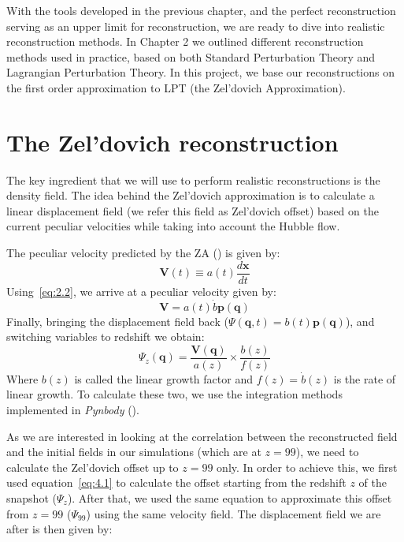 
With the tools developed in the previous chapter, and the perfect reconstruction serving as an upper limit for reconstruction, we are ready to dive into realistic reconstruction methods. In Chapter 2 we outlined different reconstruction methods used in practice, based on both Standard Perturbation Theory and Lagrangian Perturbation Theory. In this project, we base our reconstructions on the first order approximation to LPT (the Zel'dovich Approximation).

\section{The Zel'dovich reconstruction}

The key ingredient that we will use to perform realistic reconstructions is the density field. The idea behind the Zel'dovich approximation is to calculate a linear displacement field (we refer this field as Zel'dovich offset) based on the current peculiar velocities while taking into account the Hubble flow. 

The peculiar velocity predicted by the ZA (\cite{1993sfu..book.....P}) is given by:
\begin{equation}
    \textbf{V}(t) \equiv a(t)\frac{d\textbf{x}}{dt}    
\end{equation}
Using~\ref{eq:2.2}, we arrive at a peculiar velocity given by:
\begin{equation}
    \textbf{V} = a(t)\dot{b}\textbf{p}(\textbf{q})
\end{equation}
Finally, bringing the displacement field back ($\Psi(\textbf{q},t) = b(t) \textbf{p}(\textbf{q})$), and switching variables to redshift we obtain:
\begin{equation}
    \Psi_z(\textbf{q}) = \frac{\textbf{V}(\textbf{q})}{a(z)} \times \frac{b(z)}{f(z)}
    \label{eq:4.1}
\end{equation} 
Where $b(z)$ is called the linear growth factor and $f(z) = \dot{b}(z)$ is the rate of linear growth. To calculate these two, we use the integration methods implemented in \textit{Pynbody} (\cite{2013ascl.soft05002P}).

As we are interested in looking at the correlation between the reconstructed field  and the initial fields in our simulations (which are at $z=99$), we need to calculate the Zel'dovich offset up to $z=99$ only. In order to achieve this, we first used equation~\ref{eq:4.1} to calculate the offset starting from the redshift $z$ of the snapshot ($\Psi_z$). After that, we used the same equation to approximate this offset from $z=99$ ($\Psi_{99}$) using the same velocity field. The displacement field we are after is then given by:


